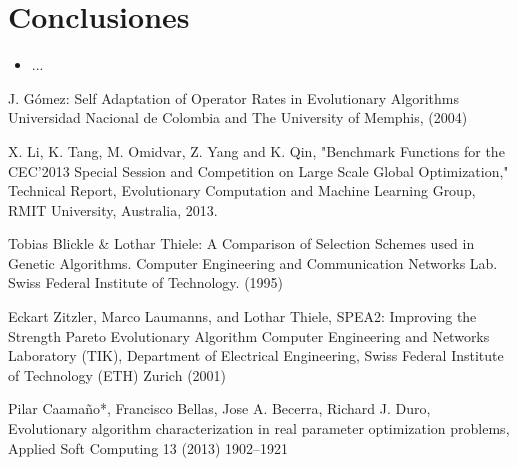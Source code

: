 \documentclass{llncs}
\begin{document}
\section{Conclusiones}

\begin{itemize}
\item ...
\end{itemize}

\begin{thebibliography}{5}
%

J. Gómez:
Self Adaptation of Operator Rates in Evolutionary Algorithms
Universidad Nacional de Colombia and The University of Memphis, (2004)

X. Li, K. Tang, M. Omidvar, Z. Yang and K. Qin, "Benchmark Functions for the CEC'2013 Special Session and Competition on Large Scale Global Optimization," Technical Report, Evolutionary Computation and Machine Learning Group, RMIT University, Australia, 2013.

Tobias Blickle \& Lothar Thiele:
A Comparison of Selection Schemes used in Genetic Algorithms.
Computer Engineering and Communication Networks Lab.
Swiss Federal Institute of Technology. (1995)

Eckart Zitzler, Marco Laumanns, and Lothar Thiele,
SPEA2: Improving the Strength Pareto Evolutionary Algorithm
Computer Engineering and Networks Laboratory (TIK),
Department of Electrical Engineering,
Swiss Federal Institute of Technology (ETH) Zurich (2001)

Pilar Caamaño*, Francisco Bellas, Jose A. Becerra, Richard J. Duro, Evolutionary algorithm characterization in real parameter optimization problems, Applied Soft Computing 13 (2013) 1902–1921

\end{thebibliography}
\end{document}
